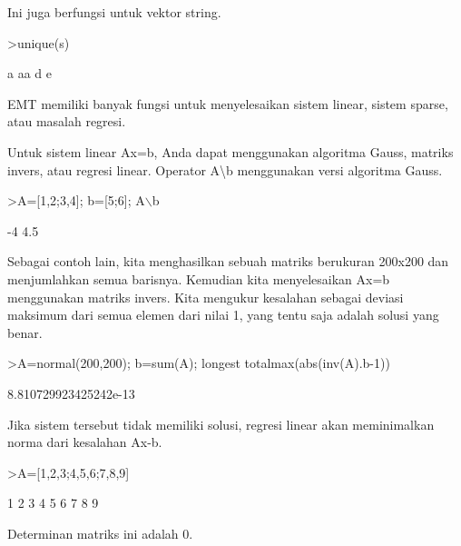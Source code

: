 \documentclass[12pt,arial,letterpaper]{book}
\begin{document}
\begin{eulercomment}
\begin{eulercomment}
\begin{eulercomment}
\begin{eulercomment}
\begin{eulercomment}
\begin{eulercomment}
\begin{eulercomment}
\begin{eulercomment}
\begin{eulercomment}
Ini juga berfungsi untuk vektor string.
\end{eulercomment}
\begin{eulerprompt}
>unique(s)
\end{eulerprompt}
\begin{euleroutput}
  a
  aa
  d
  e
\end{euleroutput}
\begin{eulercomment}
EMT memiliki banyak fungsi untuk menyelesaikan sistem linear, sistem
sparse, atau masalah regresi.

Untuk sistem linear Ax=b, Anda dapat menggunakan algoritma Gauss,
matriks invers, atau regresi linear. Operator A\textbackslash{}b menggunakan versi
algoritma Gauss.
\end{eulercomment}
\begin{eulerprompt}
>A=[1,2;3,4]; b=[5;6]; A\(\backslash\)b
\end{eulerprompt}
\begin{euleroutput}
             -4 
            4.5 
\end{euleroutput}
\begin{eulercomment}
Sebagai contoh lain, kita menghasilkan sebuah matriks berukuran
200x200 dan menjumlahkan semua barisnya. Kemudian kita menyelesaikan
Ax=b menggunakan matriks invers. Kita mengukur kesalahan sebagai
deviasi maksimum dari semua elemen dari nilai 1, yang tentu saja
adalah solusi yang benar.
\end{eulercomment}
\begin{eulerprompt}
>A=normal(200,200); b=sum(A); longest totalmax(abs(inv(A).b-1))
\end{eulerprompt}
\begin{euleroutput}
    8.810729923425242e-13 
\end{euleroutput}
\begin{eulercomment}
Jika sistem tersebut tidak memiliki solusi, regresi linear akan
meminimalkan norma dari kesalahan Ax-b.
\end{eulercomment}
\begin{eulerprompt}
>A=[1,2,3;4,5,6;7,8,9]
\end{eulerprompt}
\begin{euleroutput}
              1             2             3 
              4             5             6 
              7             8             9 
\end{euleroutput}
\begin{eulercomment}
Determinan matriks ini adalah 0.
\end{eulercomment}

\end{eulercomment}
\end{eulercomment}
\end{eulercomment}
\end{eulercomment}
\end{eulercomment}
\end{eulercomment}
\end{eulercomment}
\end{eulercomment}
\end{document}
